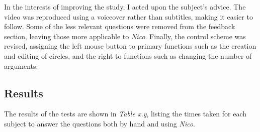 \documentclass[12pt,twoside,notitlepage,xetex]{report}
\begin{document}
In the interests of improving the study, I acted upon the subject's advice.
The video was reproduced using a voiceover rather than subtitles, making it
easier to follow.  Some of the less relevant questions were removed from the
feedback section, leaving those more applicable to \emph{Nico}.  Finally, the
control scheme was revised, assigning the left mouse button to primary
functions such as the creation and editing of circles, and the right to
functions such as changing the number of arguments.

\subsection{Results}

The results of the tests are shown in \emph{Table x.y}, listing the times taken
for each subject to answer the questions both by hand and using \emph{Nico}.
\end{document}
